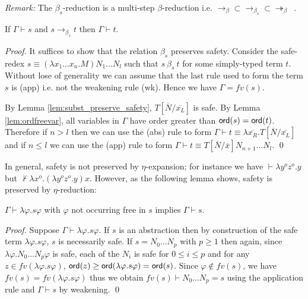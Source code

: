 \documentclass{llncs}
\newcommand\betared{\rightarrow_\beta}
\newcommand\betasred{\rightarrow_{\beta_s}}
\newcommand\betaredtr{\twoheadrightarrow_\beta} %
\newcommand\subst[2]{\left[ #1/#2 \right]}
\begin{document}
\noindent \emph{Remark:} The $\beta_s$-reduction is a multi-step
$\beta$-reduction i.e. $\betared \subset \betasred \subset
\betaredtr$\ .


\begin{lemma}
\label{lem:safered_preserve_safety}
If $\Gamma \vdash s$ and $s \betasred t$ then $\Gamma \vdash t$.
\end{lemma}

\begin{proof}
  It suffices to show that the relation $\beta_s$ preserves safety.
  Consider the safe-redex $ s \equiv (\lambda x_1 \ldots x_n . M) N_1
  \ldots N_l $ such that $s\ \beta_s\ t$ for some simply-typed term
  $t$.  Without lose of generality we can assume that the last rule
  used to form the term $s$ is {\sf(app)} i.e. not the weakening rule
  {\sf(wk)}. Hence we have $\Gamma = fv(s)$.

  By Lemma \ref{lem:subst_preserve_safety},
  $T\subst{\overline{N}}{\overline{x_L}}$ is safe.  By Lemma
  \ref{lem:ordfreevar}, all variables in $\Gamma$ have order greater
  than ${\sf ord}(s) = {\sf ord}(t)$. Therefore if $n>l$ then we can use the
  {\sf(abs)} rule to form $\Gamma \vdash t \equiv \lambda
  \overline{x_R}. T\subst{\overline{N}}{\overline{x_L}}$ and if $n
  \leq l$ we can use the {\sf(app)} rule to form $\Gamma \vdash t
  \equiv T\subst{\overline{N}}{\overline{x}} N_{n+1} \ldots N_l$.
  \qed
\end{proof}

In general, safety is not preserved by $\eta$-expansion; for instance
we have
$\vdash \lambda y^o z^o . y$ but
$\not \vdash \lambda x^o . (\lambda y^o z^o . y) x$.
However, as the following lemma shows, safety is preserved by $\eta$-reduction:

\begin{lemma}
  $\Gamma \vdash \lambda \varphi . s \varphi $ with $\varphi$ not
  occurring free in $s$ implies $\Gamma \vdash s$.
\end{lemma}
\begin{proof}
  Suppose $\Gamma \vdash \lambda \varphi . s \varphi $. If $s$ is an
  abstraction then by construction of the safe term $\lambda \varphi
  . s \varphi$, $s$ is necessarily safe.  If $s = N_0 \ldots N_p$ with
  $p\geq 1$ then again, since $\lambda \varphi . N_0 \ldots N_p
  \varphi$ is safe, each of the $N_i$ is safe for $0 \leq i \leq p$
  and for any $z\in fv(\lambda \varphi . s \varphi)$, ${\sf ord}(z) \geq
  {\sf ord}(\lambda \varphi . s \varphi) = {\sf ord}(s)$. Since $\varphi \not\in
  fv(s)$, we have $fv(s) = fv(\lambda \varphi . s \varphi)$ thus we
  obtain $fv(s) \vdash N_0 \ldots N_p = s$ using the application rule
  and $\Gamma \vdash s$ by weakening. \qed
\end{proof}
\end{document}
